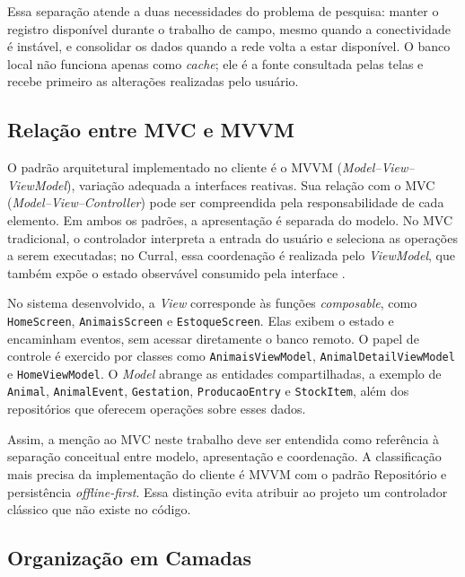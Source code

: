 Essa separação atende a duas necessidades do problema de pesquisa: manter o registro disponível durante o trabalho de campo, mesmo quando a conectividade é instável, e consolidar os dados quando a rede volta a estar disponível. O banco local não funciona apenas como \textit{cache}; ele é a fonte consultada pelas telas e recebe primeiro as alterações realizadas pelo usuário.

\subsection{Relação entre MVC e MVVM}
\label{subsec:desenvolvimento-mvvm}

O padrão arquitetural implementado no cliente é o MVVM (\textit{Model--View--ViewModel}), variação adequada a interfaces reativas. Sua relação com o MVC (\textit{Model--View--Controller}) pode ser compreendida pela responsabilidade de cada elemento. Em ambos os padrões, a apresentação é separada do modelo. No MVC tradicional, o controlador interpreta a entrada do usuário e seleciona as operações a serem executadas; no Curral, essa coordenação é realizada pelo \textit{ViewModel}, que também expõe o estado observável consumido pela interface \cite{fowler2002patterns}.

No sistema desenvolvido, a \textit{View} corresponde às funções \textit{composable}, como \texttt{HomeScreen}, \texttt{AnimaisScreen} e \texttt{EstoqueScreen}. Elas exibem o estado e encaminham eventos, sem acessar diretamente o banco remoto. O papel de controle é exercido por classes como \texttt{AnimaisViewModel}, \texttt{AnimalDetailViewModel} e \texttt{HomeViewModel}. O \textit{Model} abrange as entidades compartilhadas, a exemplo de \texttt{Animal}, \texttt{AnimalEvent}, \texttt{Gestation}, \texttt{ProducaoEntry} e \texttt{StockItem}, além dos repositórios que oferecem operações sobre esses dados.

Assim, a menção ao MVC neste trabalho deve ser entendida como referência à separação conceitual entre modelo, apresentação e coordenação. A classificação mais precisa da implementação do cliente é MVVM com o padrão Repositório e persistência \textit{offline-first}. Essa distinção evita atribuir ao projeto um controlador clássico que não existe no código.

\subsection{Organização em Camadas}
\label{subsec:desenvolvimento-camadas}

